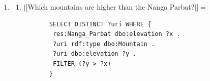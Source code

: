 \documentclass[11pt]{article}
\begin{document}
\begin{enumerate}[resume]
\item \begin{enumerate}
 \item $|[$Which mountains are higher than the Nanga Parbat?$|]=$
       \begin{small}\begin{verbatim}
       SELECT DISTINCT ?uri WHERE { 
        res:Nanga_Parbat dbo:elevation ?x .
        ?uri rdf:type dbo:Mountain .
        ?uri dbo:elevation ?y . 
        FILTER (?y > ?x) 
       }
       \end{verbatim}\end{small} 
\end{enumerate}
\end{enumerate}
\end{document}

